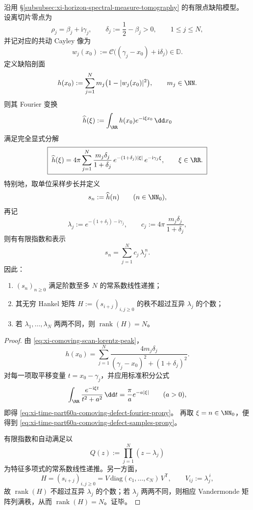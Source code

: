 \begin{theorem}\label{thm:xi-time-part60a-comoving-defect-fourier-prony-linearization}
沿用 \S\ref{subsubsec:xi-horizon-spectral-measure-tomography} 的有限点缺陷模型。
设离切片零点为
\[
\rho_j=\beta_j+\mathrm{i}\gamma_j,
\qquad
\delta_j:=\frac12-\beta_j>0,
\qquad
1\le j\le N,
\]
并记对应的共动 Cayley 像为
\[
w_j(x_0):=\mathcal C\bigl((\gamma_j-x_0)+\mathrm{i}\delta_j\bigr)\in\mathbb D.
\]
定义缺陷剖面
\[
h(x_0):=\sum_{j=1}^{N}m_j\bigl(1-|w_j(x_0)|^2\bigr),
\qquad
m_j\in\NN.
\]
则其 Fourier 变换
\[
\widehat h(\xi):=\int_{\RR}h(x_0)e^{-\mathrm{i}\xi x_0}\,\dd x_0
\]
满足完全显式分解
\begin{equation}\label{eq:xi-time-part60a-comoving-defect-fourier-prony}
\boxed{\;
\widehat h(\xi)
=
4\pi\sum_{j=1}^{N}
\frac{m_j\delta_j}{1+\delta_j}\,
e^{-(1+\delta_j)|\xi|}\,
e^{-\mathrm{i}\gamma_j\xi},
\qquad \xi\in\RR.\;}
\end{equation}
特别地，取单位采样步长并定义
\[
s_n:=\widehat h(n)
\qquad (n\in\NN_0),
\]
再记
\[
\lambda_j:=e^{-(1+\delta_j)-\mathrm{i}\gamma_j},
\qquad
c_j:=4\pi\,\frac{m_j\delta_j}{1+\delta_j},
\]
则有有限指数和表示
\begin{equation}\label{eq:xi-time-part60a-comoving-defect-samples-prony}
\boxed{\;
s_n=\sum_{j=1}^{N}c_j\,\lambda_j^{\,n}.\;}
\end{equation}
因此：
\begin{enumerate}
  \item \((s_n)_{n\ge 0}\) 满足阶数至多 \(N\) 的常系数线性递推；
  \item 其无穷 Hankel 矩阵 \(H:=(s_{i+j})_{i,j\ge 0}\) 的秩不超过互异 \(\lambda_j\) 的个数；
  \item 若 \(\lambda_1,\dots,\lambda_N\) 两两不同，则 \(\operatorname{rank}(H)=N\)。
\end{enumerate}
\end{theorem}
\begin{proof}
由 \eqref{eq:xi-comoving-scan-lorentz-peak}，
\[
h(x_0)=
\sum_{j=1}^{N}
\frac{4m_j\delta_j}{(\gamma_j-x_0)^2+(1+\delta_j)^2}.
\]
对每一项取平移变量 \(t=x_0-\gamma_j\)，并应用标准积分公式
\[
\int_{\RR}\frac{e^{-\mathrm{i}\xi t}}{t^2+a^2}\,\dd t
=
\frac{\pi}{a}e^{-a|\xi|}
\qquad(a>0),
\]
即得 \eqref{eq:xi-time-part60a-comoving-defect-fourier-prony}。
再取 \(\xi=n\in\NN_0\)，便得到
\eqref{eq:xi-time-part60a-comoving-defect-samples-prony}。

有限指数和自动满足以
\[
Q(z):=\prod_{j=1}^{N}(z-\lambda_j)
\]
为特征多项式的常系数线性递推。另一方面，
\[
H=(s_{i+j})_{i,j\ge 0}
=
V\,\mathrm{diag}(c_1,\dots,c_N)\,V^{\mathsf T},
\qquad
V_{ij}:=\lambda_j^{\,i},
\]
故 \(\operatorname{rank}(H)\) 不超过互异 \(\lambda_j\) 的个数；若
\(\lambda_j\) 两两不同，则相应 Vandermonde 矩阵列满秩，从而
\(\operatorname{rank}(H)=N\)。证毕。
\end{proof}

